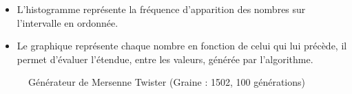 \documentclass[
]{article}
\begin{document}
\begin{itemize}
  \item L'histogramme représente la fréquence d'apparition des nombres sur l'intervalle en ordonnée.
  \item Le graphique représente chaque nombre en fonction de celui qui lui précède, il permet d'évaluer l'étendue, entre les valeurs, générée par l'algorithme.
\end{itemize}
\begin{figure}

{\centering {}

}

\caption{Générateur de Mersenne Twister (Graine : 1502, 100 générations)}\label{fig:unnamed-chunk-2}
\end{figure}
\end{document}
